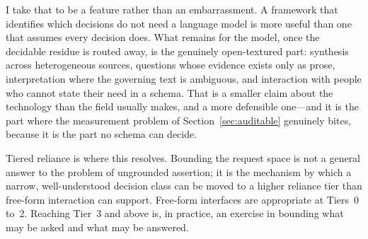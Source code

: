 I take that to be a feature rather than an embarrassment. A framework that identifies
which decisions do not need a language model is more useful than one that assumes every
decision does. What remains for the model, once the decidable residue is routed away, is
the genuinely open-textured part: synthesis across heterogeneous sources, questions whose
evidence exists only as prose, interpretation where the governing text is ambiguous, and
interaction with people who cannot state their need in a schema. That is a smaller claim
about the technology than the field usually makes, and a more defensible one---and it is
the part where the measurement problem of Section~\ref{sec:auditable} genuinely bites,
because it is the part no schema can decide.

Tiered reliance is where this resolves. Bounding the request
space is not a general answer to the problem of ungrounded assertion; it is the
mechanism by which a narrow, well-understood decision class can be moved to a higher
reliance tier than free-form interaction can support. Free-form interfaces are
appropriate at Tiers~0 to~2. Reaching Tier~3 and above is, in practice, an exercise in
bounding what may be asked and what may be answered.
